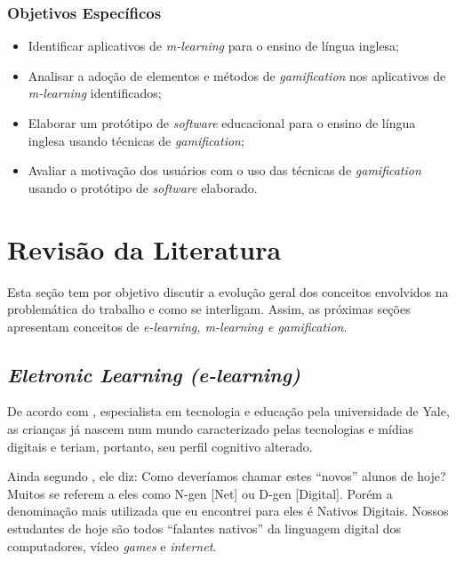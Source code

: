 \documentclass[
	12pt,				%
	openany,			%
	oneside,			%
	a4paper,			%
	english,			%
	french,				%
	spanish,			%
	brazil				%
	]{abntex2}
\begin{document}
\subsection{Objetivos Específicos}
\begin{itemize}
\item Identificar aplicativos de \textit{m-learning} para o ensino de língua inglesa;
\item Analisar a adoção de elementos e métodos de \textit{gamification} nos aplicativos de \textit{m-learning} identificados;
\item Elaborar um protótipo de \textit{software} educacional para o ensino de língua inglesa usando técnicas de \textit{gamification};
\item Avaliar a motivação dos usuários com o uso das técnicas de \textit{gamification} usando o protótipo de \textit{software} elaborado.

\end{itemize}


\chapter{Revisão da Literatura}
	Esta seção tem por objetivo discutir a evolução geral dos conceitos envolvidos na problemática do trabalho e como se interligam. Assim, as próximas seções apresentam conceitos de \textit{e-learning, m-learning e gamification}.

\section {\itshape Eletronic Learning (e-learning)}

De acordo com , especialista em tecnologia e educação pela universidade de Yale, as crianças já nascem num mundo caracterizado pelas tecnologias e mídias digitais e teriam, portanto, seu perfil cognitivo alterado.

	Ainda segundo , ele diz: Como deveríamos chamar estes “novos” alunos de hoje? Muitos se referem a eles como N-gen [Net] ou D-gen [Digital]. Porém a denominação mais utilizada que eu encontrei para eles é Nativos Digitais. Nossos estudantes de hoje são todos “falantes nativos” da linguagem digital dos computadores, vídeo \textit{games} e \textit{internet}.
\end{document}
